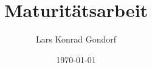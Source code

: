 \documentclass[
  a4paper,
  11pt,
  oneside
]{article}
\begin{document}
\title{Maturitätsarbeit}
\author{Lars Konrad Gondorf}
\date{\today}
\maketitle

\end{document}
